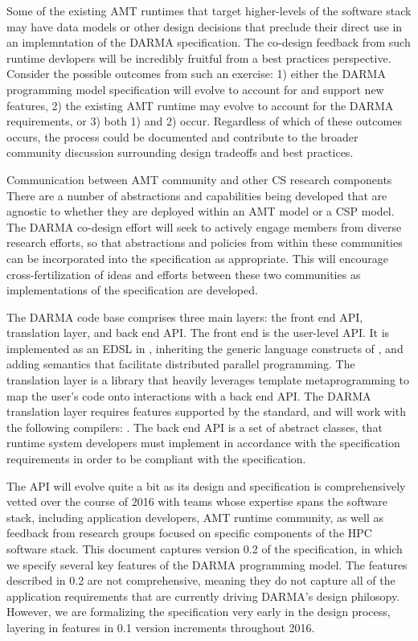 \begin{compactdesc}
Some of the existing \gls{AMT} runtimes that
target higher-levels of the software stack may have data models or other
design decisions that preclude their direct use in an implemntation of the
DARMA specification. The co-design feedback from such runtime devlopers 
will be incredibly fruitful from a best practices perspective. Consider 
the possible outcomes from such an exercise: 1) either the DARMA 
programming model specification will evolve to account for and support new
features, 2) the existing \gls{AMT} runtime may evolve to account for the DARMA
requirements, or 3) both 1) and 2) occur.  Regardless of which of these
outcomes occurs, the process could be documented and contribute to the
broader community discussion surrounding design tradeoffs and best practices. 

\item[Communication between AMT community and other CS research components]
There are a number of abstractions and capabilities being developed that are
agnostic to whether they are deployed within an \gls{AMT} model or a \gls{CSP} model.
The DARMA co-design effort will seek to actively engage members from diverse
research efforts, so that abstractions and policies from within these communities can be
incorporated into the specification as appropriate.
 This will encourage cross-fertilization of ideas and efforts between these two
 communities as implementations of the specification are developed.
\end{compactdesc}

The DARMA code base comprises three main layers: the \gls{front end} \gls{API},
\gls{translation layer}, and
\gls{back end} \gls{API}.  The \gls{front end} is the user-level \gls{API}.  It
is implemented as an \gls{EDSL} in \CC,  inheriting the generic language
constructs of \CC, and adding \gls{semantics} that facilitate distributed
parallel programming.
The \gls{translation layer} is a library that heavily leverages \CC \gls{template metaprogramming} 
to map the user's code onto interactions with a \gls{back end} \gls{API}.  
The DARMA \gls{translation layer} requires \CC features supported by the 
standard, and will work with the following compilers: .
The \gls{back end} \gls{API} is a set of abstract classes, that runtime system
developers must implement in accordance with the specification requirements in
order to be compliant with the specification.

The \gls{API} will evolve quite a bit as its design and specification is comprehensively vetted over
the course of 2016 with teams whose expertise spans the software stack,
including application
developers, \gls{AMT} runtime community, as well as feedback from
research groups focused on specific components of the \gls{HPC} software stack.
This document captures version 0.2 of the specification, in which we 
specify several key features of the DARMA programming model. The features
described in 0.2 are not comprehensive, meaning they do not capture all of the
application requirements that are currently driving DARMA's design philosopy. 
However, we are formalizing the specification very early in the
design process, layering in features in 0.1 version increments throughout 2016.

